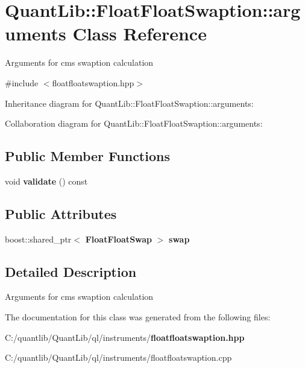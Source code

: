 \section{Quant\+Lib\+:\+:Float\+Float\+Swaption\+:\+:arguments Class Reference}
\label{class_quant_lib_1_1_float_float_swaption_1_1arguments}


Arguments for cms swaption calculation  




{\ttfamily \#include $<$floatfloatswaption.\+hpp$>$}



Inheritance diagram for Quant\+Lib\+:\+:Float\+Float\+Swaption\+:\+:arguments\+:


Collaboration diagram for Quant\+Lib\+:\+:Float\+Float\+Swaption\+:\+:arguments\+:
\subsection*{Public Member Functions}
\begin{DoxyCompactItemize}
\item 
void {\bfseries validate} () const \label{class_quant_lib_1_1_float_float_swaption_1_1arguments_ae955da898b50e6b25f072689fa377e08}

\end{DoxyCompactItemize}
\subsection*{Public Attributes}
\begin{DoxyCompactItemize}
\item 
boost\+::shared\+\_\+ptr$<$ {\bf Float\+Float\+Swap} $>$ {\bfseries swap}\label{class_quant_lib_1_1_float_float_swaption_1_1arguments_a250d49a4b15256e0282f5e46f5f73841}

\end{DoxyCompactItemize}


\subsection{Detailed Description}
Arguments for cms swaption calculation 

The documentation for this class was generated from the following files\+:\begin{DoxyCompactItemize}
\item 
C\+:/quantlib/\+Quant\+Lib/ql/instruments/{\bf floatfloatswaption.\+hpp}\item 
C\+:/quantlib/\+Quant\+Lib/ql/instruments/floatfloatswaption.\+cpp\end{DoxyCompactItemize}
